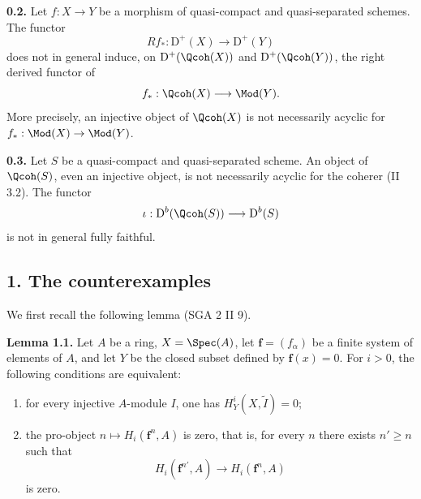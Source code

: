 \textbf{0.2.} Let $f:X\to Y$ be a morphism of quasi-compact and quasi-separated schemes. The functor
\[
 Rf_*:\mathrm D^+(X)\longrightarrow\mathrm D^+(Y)
\]
does not in general induce, on $\mathrm D^+(\Qcoh(X))$ and $\mathrm D^+(\Qcoh(Y))$, the right derived functor of
\[
 f_*:\Qcoh(X)\longrightarrow\Mod(Y).
\]
More precisely, an injective object of $\Qcoh(X)$ is not necessarily acyclic for $f_*:\Mod(X)\to\Mod(Y)$.

\textbf{0.3.} Let $S$ be a quasi-compact and quasi-separated scheme. An object of $\Qcoh(S)$, even an injective object, is not necessarily acyclic for the coherer (II 3.2). The functor
\[
 \iota:\mathrm D^b(\Qcoh(S))\longrightarrow\mathrm D^b(S)
\]
is not in general fully faithful.

\subsection*{1. The counterexamples}
We first recall the following lemma (SGA 2 II 9).

\textbf{Lemma 1.1.} Let $A$ be a ring, $X=\Spec(A)$, let $\mathbf f=(f_\alpha)$ be a finite system of elements of $A$, and let $Y$ be the closed subset defined by $\mathbf f(x)=0$. For $i>0$, the following conditions are equivalent:
\begin{enumerate}[label=(\roman*)]
\item for every injective $A$-module $I$, one has $H^i_Y(X,\widetilde I)=0$;
\item the pro-object $n\mapsto H_i(\mathbf f^n,A)$ is zero, that is, for every $n$ there exists $n'\geq n$ such that
\[
 H_i(\mathbf f^{n'},A)\longrightarrow H_i(\mathbf f^n,A)
\]
is zero.
\end{enumerate}

